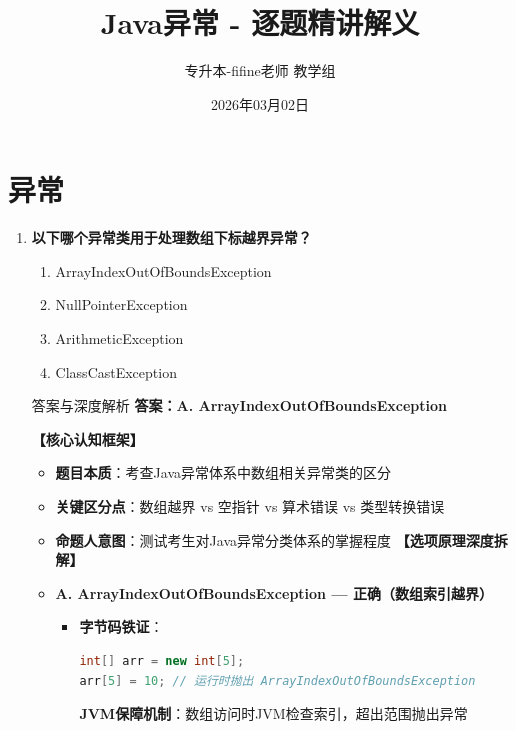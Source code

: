 \documentclass[12pt, a4paper]{ctexart}
\title{\textcolor{myblue}{\textbf{Java异常 - 逐题精讲解义}}}
\author{专升本-fifine老师 教学组}
\date{2026年03月02日}
\begin{document}
\maketitle
\thispagestyle{empty}
\newpage

\section{异常}

\begin{enumerate}[label=\textbf{\arabic*.}]

	\item \textbf{以下哪个异常类用于处理数组下标越界异常？}
	      \begin{enumerate}[label=\Alph*.]
		      \item ArrayIndexOutOfBoundsException
		      \item NullPointerException
		      \item ArithmeticException
		      \item ClassCastException
	      \end{enumerate}

	      \begin{bluebox}{答案与深度解析}
		      \textbf{答案：A. ArrayIndexOutOfBoundsException}

		      \textbf{【核心认知框架】}
		      \begin{itemize}[label={}, leftmargin=*, nosep]
			      \item \textbf{题目本质}：考查Java异常体系中数组相关异常类的区分
			      \item \textbf{关键区分点}：数组越界 vs 空指针 vs 算术错误 vs 类型转换错误
			      \item \textbf{命题人意图}：测试考生对Java异常分类体系的掌握程度
		      \needspace{10cm}
		      \textbf{【选项原理深度拆解】}

		      \item \textbf{A. ArrayIndexOutOfBoundsException — 正确（数组索引越界）}
		      \begin{itemize}[label={}, leftmargin=*, nosep]
			      \item \textbf{字节码铁证}：
			            \begin{lstlisting}[language=Java]
int[] arr = new int[5];
arr[5] = 10; // 运行时抛出 ArrayIndexOutOfBoundsException
      \end{lstlisting}
			            \textbf{JVM保障机制}：数组访问时JVM检查索引，超出范围抛出异常


\end{itemize}
\end{itemize}
\end{bluebox}
\end{enumerate}
\end{document}
